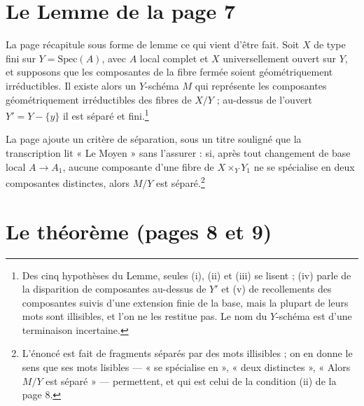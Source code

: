 \documentclass[11pt,a4paper]{article}
\begin{document}
\section*{Le Lemme de la page 7}

La page récapitule sous forme de lemme ce qui vient d'être fait. Soit $X$ de
type fini sur $Y = \mathrm{Spec}(A)$, avec $A$ local complet et $X$
universellement ouvert sur $Y$, et supposons que les composantes de la fibre
fermée soient géométriquement irréductibles. Il existe alors un $Y$-schéma $M$
qui représente les composantes géométriquement irréductibles des fibres de
$X/Y$ ; au-dessus de l'ouvert $Y' = Y - \{y\}$ il est séparé et
fini.\footnote{Des cinq hypothèses du Lemme, seules (i), (ii) et (iii) se
lisent ; (iv) parle de la disparition de composantes au-dessus de $Y'$ et (v)
de recollements des composantes suivis d'une extension finie de la base, mais
la plupart de leurs mots sont illisibles, et l'on ne les restitue pas. Le nom
du $Y$-schéma est d'une terminaison incertaine.}

La page ajoute un critère de séparation, sous un titre souligné que la
transcription lit « Le Moyen » sans l'assurer : si, après tout changement de
base local $A \to A_1$, aucune composante d'une fibre de $X \times_Y Y_1$ ne se
spécialise en deux composantes distinctes, alors $M/Y$ est
séparé.\footnote{L'énoncé est fait de fragments séparés par des mots
illisibles ; on en donne le sens que ses mots lisibles --- « se spécialise
en », « deux distinctes », « Alors $M/Y$ est séparé » --- permettent, et qui
est celui de la condition (ii) de la page 8.}

\section*{Le théorème (pages 8 et 9)}
\end{document}
